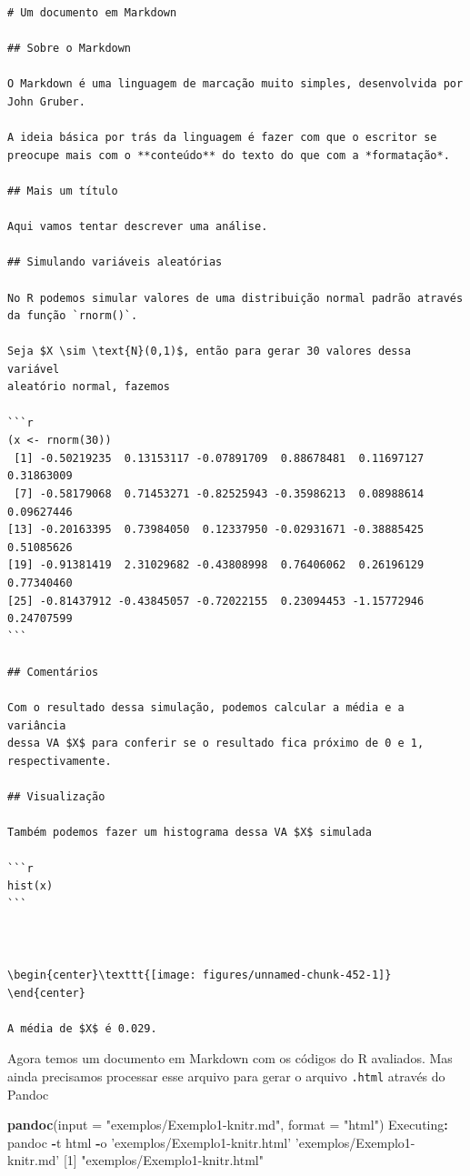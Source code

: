 \documentclass[10pt,a4paper]{book}
\newenvironment{Shaded}{\begin{snugshade}}{\end{snugshade}}
\newcommand{\KeywordTok}[1]{\textcolor[rgb]{0.13,0.29,0.53}{\textbf{#1}}}
\newcommand{\DataTypeTok}[1]{\textcolor[rgb]{0.13,0.29,0.53}{#1}}
\newcommand{\DecValTok}[1]{\textcolor[rgb]{0.00,0.00,0.81}{#1}}
\newcommand{\StringTok}[1]{\textcolor[rgb]{0.31,0.60,0.02}{#1}}
\newcommand{\OperatorTok}[1]{\textcolor[rgb]{0.81,0.36,0.00}{\textbf{#1}}}
\newcommand{\NormalTok}[1]{#1}
\begin{document}
\begin{verbatim}
# Um documento em Markdown

## Sobre o Markdown

O Markdown é uma linguagem de marcação muito simples, desenvolvida por
John Gruber.

A ideia básica por trás da linguagem é fazer com que o escritor se
preocupe mais com o **conteúdo** do texto do que com a *formatação*.

## Mais um título

Aqui vamos tentar descrever uma análise.

## Simulando variáveis aleatórias

No R podemos simular valores de uma distribuição normal padrão através
da função `rnorm()`.

Seja $X \sim \text{N}(0,1)$, então para gerar 30 valores dessa variável
aleatório normal, fazemos

```r
(x <- rnorm(30))
 [1] -0.50219235  0.13153117 -0.07891709  0.88678481  0.11697127  0.31863009
 [7] -0.58179068  0.71453271 -0.82525943 -0.35986213  0.08988614  0.09627446
[13] -0.20163395  0.73984050  0.12337950 -0.02931671 -0.38885425  0.51085626
[19] -0.91381419  2.31029682 -0.43808998  0.76406062  0.26196129  0.77340460
[25] -0.81437912 -0.43845057 -0.72022155  0.23094453 -1.15772946  0.24707599
```

## Comentários

Com o resultado dessa simulação, podemos calcular a média e a variância
dessa VA $X$ para conferir se o resultado fica próximo de 0 e 1,
respectivamente.

## Visualização

Também podemos fazer um histograma dessa VA $X$ simulada

```r
hist(x)
```



\begin{center}\texttt{[image: figures/unnamed-chunk-452-1]} \end{center}

A média de $X$ é 0.029.
\end{verbatim}

Agora temos um documento em Markdown com os códigos do R avaliados. Mas
ainda precisamos processar esse arquivo para gerar o arquivo
\texttt{.html} através do Pandoc

\begin{Shaded}
\begin{Highlighting}[]
\KeywordTok{pandoc}\NormalTok{(}\DataTypeTok{input =} \StringTok{"exemplos/Exemplo1-knitr.md"}\NormalTok{, }\DataTypeTok{format =} \StringTok{"html"}\NormalTok{)}
\NormalTok{Executing}\OperatorTok{:}\StringTok{ }\NormalTok{pandoc }\OperatorTok{-}\NormalTok{t html }\OperatorTok{-}\NormalTok{o }\StringTok{'exemplos/Exemplo1-knitr.html'} \StringTok{'exemplos/Exemplo1-knitr.md'}
\NormalTok{[}\DecValTok{1}\NormalTok{] }\StringTok{"exemplos/Exemplo1-knitr.html"}
\end{Highlighting}
\end{Shaded}
\end{document}
